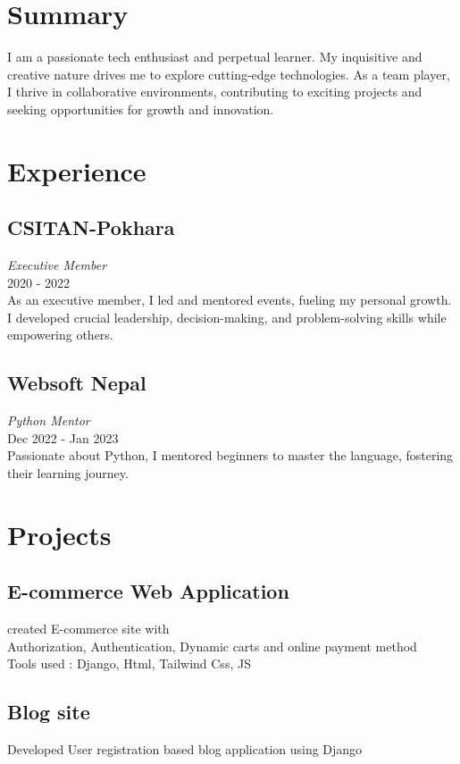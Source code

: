 \documentclass[a4paper,11pt]{article}
\begin{document}
\begin{minipage}[t]{0.6\textwidth}
    \section*{Summary}
    I am a passionate tech enthusiast and perpetual learner. My inquisitive and creative nature drives me to explore cutting-edge technologies. As a team player, I thrive in collaborative environments, contributing to exciting projects and seeking opportunities for growth and innovation.
        
    \section*{Experience}
    \subsection*{CSITAN-Pokhara}
    \textit{Executive Member} \\
    2020 - 2022 \\
    As an executive member, I led and mentored events, fueling my personal growth. I developed crucial leadership, decision-making, and problem-solving skills while empowering others.
    
    \subsection*{Websoft Nepal}
    \textit{Python Mentor} \\
    Dec 2022 - Jan 2023 \\
    Passionate about Python, I mentored beginners to master the language, fostering their learning journey.
    
    \section*{Projects}
    \subsection*{E-commerce Web Application}
    {created E-commerce site with }\\
    {Authorization, Authentication, Dynamic carts and online payment method}\\
    { Tools used : Django, Html, Tailwind Css, JS}
    \subsection*{Blog site}
    {Developed User registration based blog application using Django}

\end{minipage}
\end{document}
